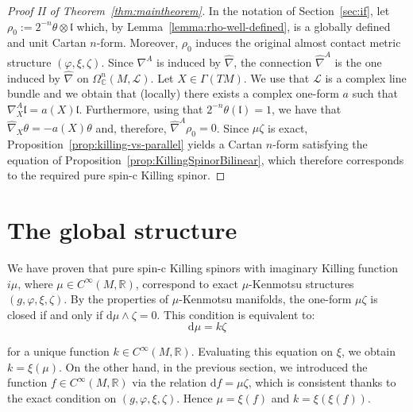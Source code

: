 \documentclass[10pt,a4paper,twoside,reqno]{amsart}
\theoremstyle{plain}
\theoremstyle{definition}
\theoremstyle{remark}
\def\C{\mathbb{C}}
\def\R{\mathbb{R}}
\def\dd{\mathrm{d}}
\def\R{\mathbb{R}}
\def\dd{\mathrm{d}}
\begin{document}
\begin{proof}[Proof II of Theorem~\ref{thm:maintheorem}]
\noindent
In the notation of Section~\ref{sec:if}, let $\rho_0:=2^{-n}\theta\otimes\mathfrak l$ which, by Lemma~\ref{lemma:rho-well-defined}, is a globally defined and unit Cartan $n$-form. Moreover, $\rho_0$ induces the original almost contact metric structure $(\varphi,\xi,\zeta)$. Since $\nabla^A$ is induced by $\hat\nabla$, the connection $\hat\nabla^A$ is the one induced by $\hat\nabla$ on $\Omega^n_\C(M,\mathcal{L})$. Let $X\in\Gamma(TM)$. We use that $\mathcal{L}$ is a complex line bundle and we obtain that (locally) there exists a complex one-form $a$ such that $\nabla^A_X \mathfrak l = a(X)\mathfrak l$. Furthermore, using that $2^{-n}\theta (\mathfrak l) = 1$, we have that $\hat\nabla_X\theta = -a(X)\theta$ and, therefore, $\hat\nabla^A \rho_0=0$. Since $\mu\zeta$ is exact, Proposition~\ref{prop:killing-vs-parallel} yields a Cartan $n$-form satisfying the equation of Proposition~\ref{prop:KillingSpinorBilinear}, which therefore corresponds to the required pure spin-c Killing spinor.
\end{proof}


\section{The global structure}
\label{sec:global}


We have proven that pure spin-c Killing spinors with imaginary Killing function $i\mu$, where $\mu \in C^{\infty}(M,\R)$, correspond to exact $\mu$-Kenmotsu structures $(g,\varphi,\xi,\zeta)$. By the properties of $\mu$-Kenmotsu manifolds, the one-form $\mu\zeta$ is closed if and only if $\dd\mu\wedge\zeta=0$. This condition is equivalent to:
\begin{equation*}
\dd\mu = k\zeta
\end{equation*}

\noindent
for a unique function $k\in C^{\infty}(M,\R)$. Evaluating this equation on $\xi$, we obtain $k=\xi(\mu)$. On the other hand, in the previous section, we introduced the function $f\in C^{\infty}(M,\R)$ via the relation $\dd f = \mu\zeta$, which is consistent thanks to the exact condition on $(g,\varphi,\xi,\zeta)$. Hence $\mu = \xi(f)$ and $k=\xi(\xi(f))$.\medskip
\end{document}
